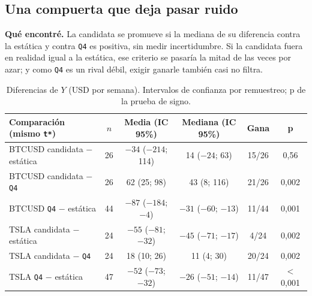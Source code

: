 \documentclass[11pt,a4paper]{article}
\newcommand{\code}[1]{\texttt{\small #1}}
\begin{document}
\subsection{Una compuerta que deja pasar ruido}
\label{sec:compuerta}

\textbf{Qué encontré.} La candidata se promueve si la mediana de su diferencia contra la estática y contra
\code{Q4} es positiva, sin medir incertidumbre. Si la candidata fuera en realidad igual a la estática, ese
criterio se pasaría la mitad de las veces por azar; y como \code{Q4} es un rival débil, exigir ganarle
también casi no filtra.

\begin{table}[h]
\centering\small
\begin{tabular}{lccccc}
\toprule
Comparación (mismo \code{t*}) & $n$ & Media (IC 95\%) & Mediana (IC 95\%) & Gana & p \\
\midrule
BTCUSD candidata $-$ estática & 26 & $-34$ ($-214$; 114) & 14 ($-24$; 63) & 15/26 & 0,56 \\
BTCUSD candidata $-$ \code{Q4} & 26 & 62 (25; 98) & 43 (8; 116) & 21/26 & 0,002 \\
BTCUSD \code{Q4} $-$ estática & 44 & $-87$ ($-184$; $-4$) & $-31$ ($-60$; $-13$) & 11/44 & 0,001 \\
TSLA candidata $-$ estática & 24 & $-55$ ($-81$; $-32$) & $-45$ ($-71$; $-17$) & 4/24 & 0,002 \\
TSLA candidata $-$ \code{Q4} & 24 & 18 (10; 26) & 11 (4; 30) & 20/24 & 0,002 \\
TSLA \code{Q4} $-$ estática & 47 & $-52$ ($-73$; $-32$) & $-26$ ($-51$; $-14$) & 11/47 & $<$0,001 \\
\bottomrule
\end{tabular}
\caption{Diferencias de $Y$ (USD por semana). Intervalos de confianza por remuestreo\protect\footnotemark;
p de la prueba de signo\protect\footnotemark.}
\label{tab:compuerta}
\end{table}
\end{document}

